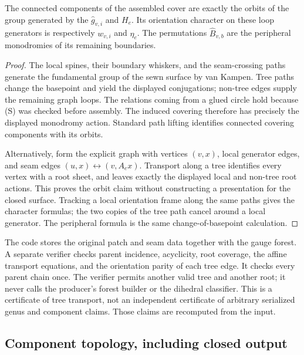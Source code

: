 \begin{proposition}
The connected components of the assembled cover are exactly the orbits
of the group generated by the $\widehat g_{v,i}$ and $H_e$.  Its orientation
character on these loop generators is respectively $w_{v,i}$ and $\eta_e$.
The permutations $\widehat B_{v,b}$ are the peripheral monodromies of its
remaining boundaries.
\end{proposition}
\begin{proof}
The local spines, their boundary whiskers, and the seam-crossing paths
generate the fundamental group of the sewn surface by van Kampen.  Tree
paths change the basepoint and yield the displayed conjugations; non-tree
edges supply the remaining graph loops.  The relations coming from a glued
circle hold because (S) was checked before assembly.  The induced covering
therefore has precisely the displayed monodromy action.  Standard path
lifting identifies connected covering components with its orbits.

Alternatively, form the explicit graph with vertices $(v,x)$, local
generator edges, and seam edges $(u,x)\leftrightarrow(v,A_ex)$.  Transport
along a tree identifies every vertex with a root sheet, and leaves exactly
the displayed local and non-tree root actions.  This proves the orbit claim
without constructing a presentation for the closed surface.  Tracking a
local orientation frame along the same paths gives the character formulas;
the two copies of the tree path cancel around a local generator.  The
peripheral formula is the same change-of-basepoint calculation.
\end{proof}

The code stores the original patch and seam data together with the gauge
forest.  A separate verifier checks parent incidence, acyclicity, root
coverage, the affine transport equations, and the orientation parity of
each tree edge.  It checks every parent chain once.  The verifier permits
another valid tree and another root; it never calls the producer's forest
builder or the dihedral classifier.  This is a certificate of tree
transport, not an independent certificate of arbitrary serialized genus
and component claims.  Those claims are recomputed from the input.

\subsection{Component topology, including closed output}


